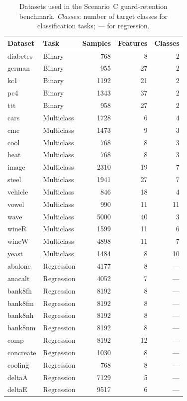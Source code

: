 \begin{table}[ht]
\centering
\footnotesize
\caption{Datasets used in the Scenario~C guard-retention benchmark. \textit{Classes}: number of target classes for classification tasks; \textit{---} for regression.}
\label{tab:guarded_scenario_c_datasets}
\begin{tabular}{llrrr}
\toprule
Dataset & Task & Samples & Features & Classes \\
\midrule
diabetes & Binary & 768 & 8 & 2 \\
german & Binary & 955 & 27 & 2 \\
kc1 & Binary & 1192 & 21 & 2 \\
pc4 & Binary & 1343 & 37 & 2 \\
ttt & Binary & 958 & 27 & 2 \\
\midrule
cars & Multiclass & 1728 & 6 & 4 \\
cmc & Multiclass & 1473 & 9 & 3 \\
cool & Multiclass & 768 & 8 & 3 \\
heat & Multiclass & 768 & 8 & 3 \\
image & Multiclass & 2310 & 19 & 7 \\
steel & Multiclass & 1941 & 27 & 7 \\
vehicle & Multiclass & 846 & 18 & 4 \\
vowel & Multiclass & 990 & 11 & 11 \\
wave & Multiclass & 5000 & 40 & 3 \\
wineR & Multiclass & 1599 & 11 & 6 \\
wineW & Multiclass & 4898 & 11 & 7 \\
yeast & Multiclass & 1484 & 8 & 10 \\
\midrule
abalone & Regression & 4177 & 8 & --- \\
anacalt & Regression & 4052 & 7 & --- \\
bank8fh & Regression & 8192 & 8 & --- \\
bank8fm & Regression & 8192 & 8 & --- \\
bank8nh & Regression & 8192 & 8 & --- \\
bank8nm & Regression & 8192 & 8 & --- \\
comp & Regression & 8192 & 12 & --- \\
concreate & Regression & 1030 & 8 & --- \\
cooling & Regression & 768 & 8 & --- \\
deltaA & Regression & 7129 & 5 & --- \\
deltaE & Regression & 9517 & 6 & --- \\

\end{tabular}
\end{table}
